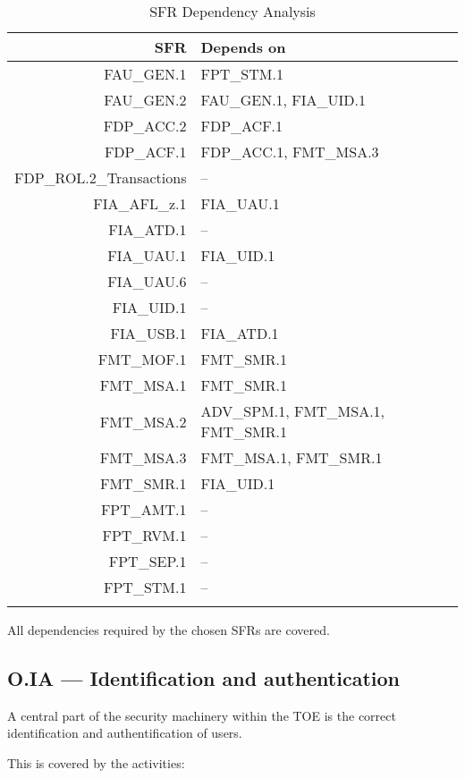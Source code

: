 \documentclass[12pt,english]{scrbook}
\begin{document}
\begin{longtable}{rp{8cm}}
        \toprule
        SFR                 &   Depends on  \\
        \midrule\endhead
FAU\_GEN.1                  &   FPT\_STM.1   \\
FAU\_GEN.2                  &   FAU\_GEN.1, FIA\_UID.1 \\
FDP\_ACC.2                  &   FDP\_ACF.1 \\
FDP\_ACF.1                  &   FDP\_ACC.1, FMT\_MSA.3 \\
FDP\_ROL.2\_Transactions    &   -- \\
FIA\_AFL\_z.1               &   FIA\_UAU.1 \\
FIA\_ATD.1                  &   -- \\
FIA\_UAU.1                  &   FIA\_UID.1 \\
FIA\_UAU.6                  &   -- \\
FIA\_UID.1                  &   -- \\
FIA\_USB.1                  &   FIA\_ATD.1 \\
FMT\_MOF.1                  &   FMT\_SMR.1 \\
FMT\_MSA.1                  &   FMT\_SMR.1 \\
FMT\_MSA.2                  &   ADV\_SPM.1, FMT\_MSA.1, FMT\_SMR.1 \\
FMT\_MSA.3                  &   FMT\_MSA.1, FMT\_SMR.1 \\
FMT\_SMR.1                  &   FIA\_UID.1 \\
FPT\_AMT.1                  &   -- \\
FPT\_RVM.1                  &   -- \\
FPT\_SEP.1                  &   -- \\
FPT\_STM.1                  &   -- \\
\bottomrule
   \caption{SFR Dependency Analysis}
\end{longtable}

All dependencies required by the chosen SFRs are covered. 

\subsection{O.IA --- Identification and authentication}

    A central part of the security machinery within the TOE is the correct
    identification and authentification of users.

    This is covered by the activities:
\end{document}

